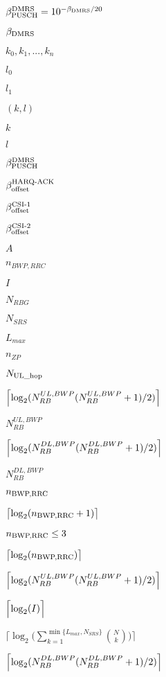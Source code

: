 \documentclass{article}
\begin{document}
$\beta _{\textup{PUSCH}}^{\textup{DMRS}}=10^{-\beta_{\textup{DMRS}}/20}$
\pagebreak

$\beta_{\textup{DMRS}}$
\pagebreak

${k_0, k_1, ..., k_n}$
\pagebreak

$l_0$
\pagebreak

$l_1$
\pagebreak

$(k, l)$
\pagebreak

$k$
\pagebreak

$l$
\pagebreak

$\beta_{\textup{PUSCH}}^{\textup{DMRS}}$
\pagebreak

$\beta _\textup{offset} ^\textup{HARQ-ACK}$
\pagebreak

$\beta _\textup{offset} ^\textup{CSI-1}$
\pagebreak

$\beta _\textup{offset} ^\textup{CSI-2}$
\pagebreak

$A$
\pagebreak

$n_{BWP,RRC}$
\pagebreak

$I$
\pagebreak

$N_{RBG}$
\pagebreak

$N_{SRS}$
\pagebreak

$L_{max}$
\pagebreak

$n_{ZP}$
\pagebreak

$N_{\textup{UL\_hop}}$
\pagebreak

$\Bigl \lceil \log_2(N_{RB}^{UL,BWP}(N_{RB}^{UL,BWP}+1)/2) \Bigr
\rceil$
\pagebreak

$N_{RB}^{UL,BWP}$
\pagebreak

$\Bigl \lceil \log_2(N_{RB}^{DL,BWP}(N_{RB}^{DL,BWP}+1)/2) \Bigr
\rceil$
\pagebreak

$N_{RB}^{DL,BWP}$
\pagebreak

$n_{\textup{BWP,RRC}}$
\pagebreak

$\bigl \lceil \log_2(n_{\textup{BWP,RRC}} + 1)\bigr \rceil$
\pagebreak

$n_{\textup{BWP,RRC}} \leq 3$
\pagebreak

$\bigl \lceil \log_2(n_{\textup{BWP,RRC}})\bigr \rceil$
\pagebreak

$\Bigl \lceil \log_2(N_{RB}^{UL,BWP}(N_{RB}^{UL,BWP}+1)/2) \Bigr \rceil$
\pagebreak

$\Bigl \lceil \log_2(I) \Bigr \rceil$
\pagebreak

$\Biggl \lceil \log_2 \Biggl
(\sum_{k=1}^{\min\{L_{max}, N_{SRS}\}}\binom{N}{k} \Biggr) \Biggr \rceil $
\pagebreak

$\Bigl \lceil \log_2(N_{RB}^{DL,BWP}(N_{RB}^{DL,BWP}+1)/2) \Bigr \rceil$
\pagebreak
\end{document}
